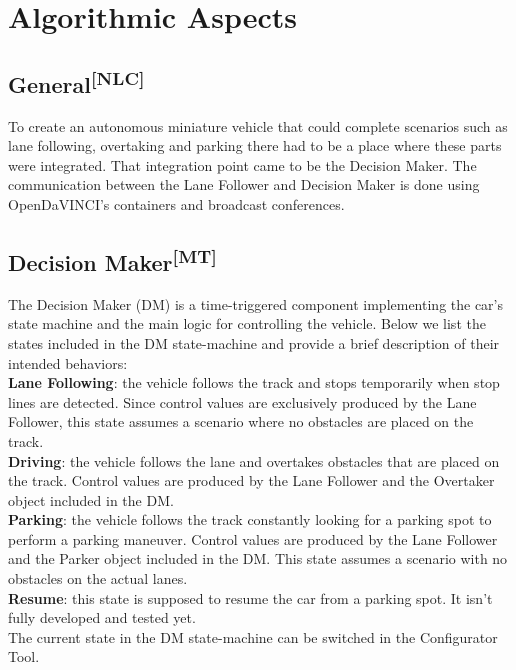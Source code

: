 \chapter{Algorithmic Aspects}
\section[General]{General\textsuperscript{[NLC]}}
To create an autonomous miniature vehicle that could complete scenarios such as
lane following, overtaking and parking there had to be a place where these parts
were integrated. That integration point came to be the Decision Maker. The
communication between the Lane Follower and Decision Maker is done using
OpenDaVINCI’s containers and broadcast conferences.

\section[Decision Maker]{Decision Maker\textsuperscript{[MT]}}
The Decision Maker (DM) is a time-triggered component implementing the car's
state machine and the main logic for controlling the vehicle. Below we list the
states included in the DM state-machine and provide a brief description of their
intended behaviors:\\

\noindent
\textbf{Lane Following}: the vehicle follows the track and stops temporarily
when stop lines are detected. Since control values are exclusively produced by
the Lane Follower, this state assumes a scenario where no obstacles are placed
on the track.\\
\textbf{Driving}: the vehicle follows the lane and overtakes obstacles that are
placed on the track. Control values are produced by the Lane Follower and the
Overtaker object included in the DM.\\
\textbf{Parking}: the vehicle follows the track constantly looking for a parking
spot to perform a parking maneuver. Control values are produced by the Lane
Follower and the Parker object included in the DM. This state assumes a scenario
with no obstacles on the actual lanes.\\
\textbf{Resume}: this state is supposed to resume the car from a parking spot.
It isn't fully developed and tested yet.\\
The current state in the DM state-machine can be switched in the Configurator
Tool.\\


